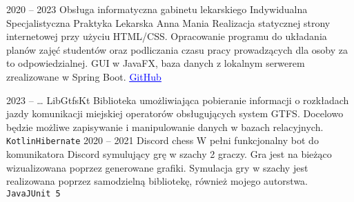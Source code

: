 \documentclass[8pt]{developercv} %
\begin{document}


\begin{entrylist}
  \entry
    {2020 -- 2023}
    {Obsługa informatyczna gabinetu lekarskiego}
    {Indywidualna Specjalistyczna Praktyka Lekarska Anna Mania}
    {
      Realizacja statycznej strony internetowej przy użyciu HTML/CSS.
      Opracowanie programu do układania planów zajęć studentów oraz podliczania czasu pracy prowadzących dla osoby za to odpowiedzialnej.
      GUI w JavaFX, baza danych z lokalnym serwerem zrealizowane w Spring Boot.
      \href{https://github.com/pulkowski-jan/timetablescheduler}{
        \textcolor{blue}{\underline{GitHub}}
      }
    }
\end{entrylist}


\begin{entrylist}
  \entry
    {2023 -- \ldots}
    {LibGtfsKt}
    {}
    {
      Biblioteka umożliwiająca pobieranie informacji o rozkładach jazdy komunikacji miejskiej operatorów obsługujących system GTFS.
      Docelowo będzie możliwe zapisywanie i manipulowanie danych w bazach relacyjnych.
      \texttt{Kotlin}\slashsep\texttt{Hibernate}
    }
  \entry
    {2020 -- 2021}
    {Discord chess}
    {}
    {
      W pełni funkcjonalny bot do komunikatora Discord symulujący grę w szachy 2 graczy.
      Gra jest na bieżąco wizualizowana poprzez generowane grafiki.
      Symulacja gry w szachy jest realizowana poprzez samodzielną bibliotekę, również mojego autorstwa.
      \\\texttt{Java}\slashsep\texttt{JUnit 5}
    }
\end{entrylist}


\end{document}
